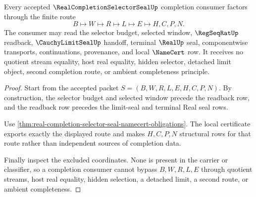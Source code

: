 \begin{theorem}
\label{thm:real-completion-selector-seal-nonescape}
Every accepted $\RealCompletionSelectorSealUp$ completion consumer factors through the finite route
$$
B \longmapsto W \longmapsto R \longmapsto L \longmapsto E \longmapsto H,C,P,N.
$$
The consumer may read the selector budget, selected window, $\RegSeqRatUp$ readback, $\CauchyLimitSealUp$ handoff, terminal $\RealUp$ seal, componentwise transports, continuations, provenance, and local $\NameCert$ row. It receives no quotient stream equality, host real equality, hidden selector, detached limit object, second completion route, or ambient completeness principle.
\end{theorem}
\begin{proof}
Start from the accepted packet $S=(B,W,R,L,E,H,C,P,N)$. By construction, the selector budget and selected window precede the readback row, and the readback row precedes the limit-seal and terminal Real seal rows.

Use \autoref{thm:real-completion-selector-seal-namecert-obligations}. The local certificate exports exactly the displayed route and makes $H,C,P,N$ structural rows for that route rather than independent sources of completion data.

Finally inspect the excluded coordinates. None is present in the carrier or classifier, so a completion consumer cannot bypass $B,W,R,L,E$ through quotient streams, host real equality, hidden selection, a detached limit, a second route, or ambient completeness.
\end{proof}

